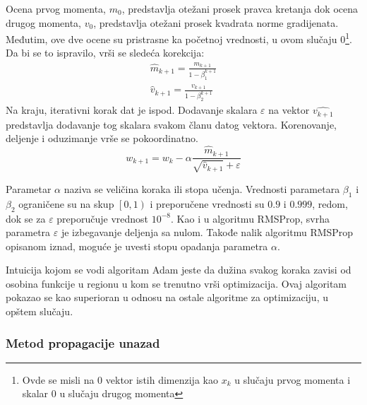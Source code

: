Ocena prvog momenta, $m_0$, predstavlja otežani prosek pravca kretanja dok ocena drugog momenta, $v_0$, predstavlja otežani prosek kvadrata norme gradijenata. Međutim, ove dve ocene su pristrasne ka početnoj vrednosti, u ovom slučaju $0$\footnote{Ovde se misli na $0$ vektor istih dimenzija kao $x_k$ u slučaju prvog momenta i skalar $0$ u slučaju drugog momenta}. Da bi se to ispravilo, vrši se sledeća korekcija:
\begin{equation}
	\begin{gathered}
		\hat{m}_{k+1} = \frac{m_{k+1} }{1 - \beta_1^{k+1}} \\
		\hat{v}_{k+1} = \frac{v_{k+1} }{1 - \beta_2^{k+1}}
	\end{gathered}
\end{equation}
Na kraju, iterativni korak dat je ispod. Dodavanje skalara $\varepsilon$ na vektor $\hat{v_{k+1}}$ predstavlja dodavanje tog skalara svakom članu datog vektora. Korenovanje, deljenje i oduzimanje vrše se pokoordinatno.
\begin{equation}
	w_{k+1} = w_k - \alpha \frac{\hat{m}_{k+1}}{\sqrt{\hat{v}_{k+1}} + \varepsilon}
\end{equation}

Parametar $\alpha$ naziva se veličina koraka ili stopa učenja. Vrednosti parametara $\beta_1$ i $\beta_2$ ograničene su na skup $\left[0, 1\right) $ i preporučene vrednosti su $0.9$ i $0.999$, redom, dok se za $\varepsilon$ preporučuje vrednost $10^{-8}$. Kao i u algoritmu RMSProp, svrha parametra $\varepsilon$ je izbegavanje deljenja sa nulom. Takođe nalik algoritmu RMSProp opisanom iznad, moguće je uvesti stopu opadanja parametra $\alpha$.
\par
Intuicija kojom se vodi algoritam Adam jeste da dužina svakog koraka zavisi od osobina funkcije u regionu u kom se trenutno vrši optimizacija. Ovaj algoritam pokazao se kao superioran u odnosu na ostale algoritme za optimizaciju, u opštem slučaju.



\subsubsection{Metod propagacije unazad}
\label{subsub:backprop}

